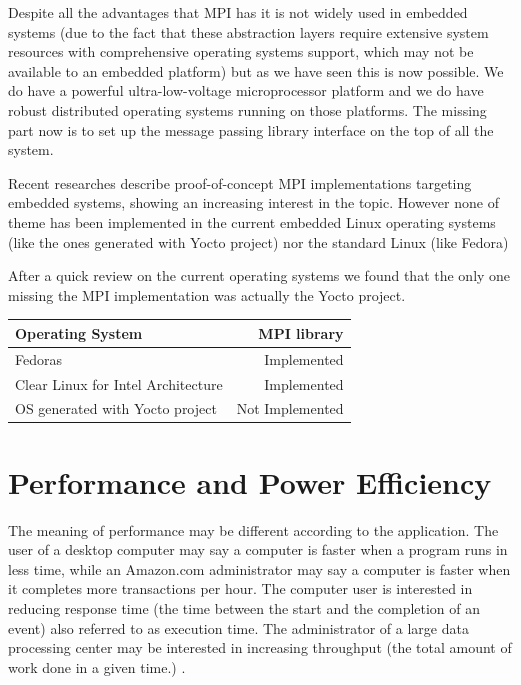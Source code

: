 Despite all the advantages that MPI has it is not widely used in embedded
systems (due to the fact that these abstraction layers require extensive
system resources with comprehensive operating systems support, which may not be
available to an embedded platform) but as we have seen this is now possible. We
do have a powerful ultra-low-voltage microprocessor platform
\cite{minnowboard} and we do have robust distributed operating systems running on
those platforms. The missing part now is to set up the message passing library
interface on the top of all the system. 

Recent researches \cite{Saldana} \cite{Gallego} \cite{McMahon} describe
proof-of-concept MPI implementations targeting embedded systems, showing an
increasing interest in the topic. However none of theme has been implemented in
the current embedded Linux operating systems (like the ones generated with
Yocto project\cite{yocto-project}) nor the standard Linux (like
Fedora\cite{fedora})

After a quick review on the current operating systems we found that the only
one missing the MPI implementation was actually the Yocto project.


\begin{center}
\begin{tabular}{ | l | r |}
    \hline
    Operating System & MPI library  \\ \hline
    Fedoras & Implemented  \\ \hline
    Clear Linux for Intel Architecture & Implemented  \\ \hline
    OS generated with Yocto project & Not Implemented  \\ \hline
\end{tabular}
\label{tab:4.2}
\end{center}


\section{Performance and Power Efficiency}

\noindent

The meaning of performance may be different according to the application.
The user of a desktop computer may say a computer is faster when a program runs in less
time, while an Amazon.com administrator may say a computer is faster when it
completes more transactions per hour. The computer user is interested in 
reducing response time (the time between the start and the completion of an 
event) \cite{Hennessy} also referred to as execution time. The administrator of a large data 
processing center may be interested in increasing throughput (the total amount 
of work done in a given time.) \cite{Hennessy}. 

